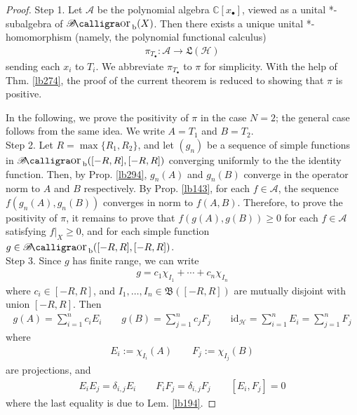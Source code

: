 \documentclass[12pt,b5paper,notitlepage]{article}
\theoremstyle{definition}
\theoremstyle{plain}
\DeclareMathOperator{\Borb}{{\mathscr{B}\text{\kern -2pt {\calligra\large or}}\,}_{\mathrm b}}
\newcommand{\fk}{\mathfrak}
\newcommand{\id}{\mathrm{id}}
\newcommand{\scr}{\mathscr}
\newcommand{\blt}{\bullet}
\newcommand{\Cbb}{\mathbb C}
\newcommand{\MH}{\mathcal H}
\numberwithin{equation}{section}
\begin{document}
\begin{proof}
Step 1. Let $\scr A$ be the polynomial algebra $\Cbb[x_\blt]$, viewed as a unital *-subalgebra of $\Borb(X)$. Then there exists a unique unital *-homomorphism (namely, the polynomial functional calculus)
\begin{align*}
\pi_{T_\blt}:\scr A\rightarrow\fk L(\MH)
\end{align*}
sending each $x_i$ to $T_i$. We abbreviate $\pi_{T_\blt}$ to $\pi$ for simplicity. With the help of Thm. \ref{lb274}, the proof of the current theorem is reduced to showing that $\pi$ is positive. 

In the following, we prove the positivity of $\pi$ in the case $N=2$; the general case follows from the same idea. We write $A=T_1$ and $B=T_2$.\\[-1ex]

Step 2. Let $R=\max\{R_1,R_2\}$, and let $(g_n)$ be a sequence of simple functions in $\Borb([-R,R],[-R,R])$ converging uniformly to the the identity function. Then, by Prop. \ref{lb294}, $g_n(A)$ and $g_n(B)$ converge in the operator norm to $A$ and $B$ respectively. By Prop. \ref{lb143}, for each $f\in\scr A$, the sequence $f(g_n(A),g_n(B))$ converges in norm to $f(A,B)$. Therefore, to prove the positivity of $\pi$, it remains to prove that $f(g(A),g(B))\geq0$ for each $f\in\scr A$ satisfying $f|_X\geq0$, and for each simple function $g\in\Borb([-R,R],[-R,R])$.\\[-1ex]

Step 3. Since $g$ has finite range, we can write
\begin{align*}
g=c_1\chi_{I_1}+\cdots+c_n\chi_{I_n}
\end{align*}
where $c_i\in[-R,R]$, and $I_1,\dots,I_n\in\fk B([-R,R])$ are mutually disjoint with union $[-R,R]$. Then
\begin{align*}
g(A)=\sum_{i=1}^n c_iE_i\qquad g(B)=\sum_{j=1}^n c_jF_j\qquad \id_\MH=\sum_{i=1}^n E_i=\sum_{j=1}^n F_j
\end{align*}
where
\begin{align*}
E_i:=\chi_{I_i}(A)\qquad F_j:=\chi_{I_j}(B)
\end{align*}
are projections, and
\begin{align*}
E_iE_j=\delta_{i,j}E_i\qquad F_iF_j=\delta_{i,j}F_j\qquad [E_i,F_j]=0
\end{align*}
where the last equality is due to Lem. \ref{lb194}. 


\end{proof}
\end{document}
